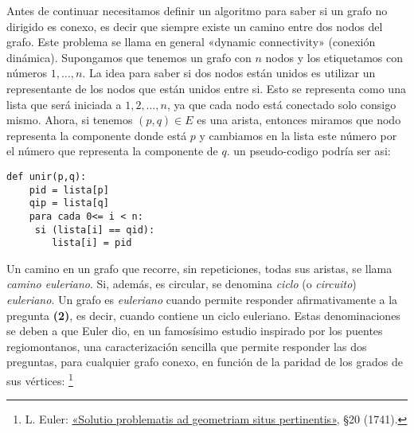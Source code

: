 Antes de continuar necesitamos definir un algoritmo para saber si un grafo no dirigido es conexo, es decir que siempre existe un camino entre dos nodos del grafo. Este problema se llama en general «dynamic connectivity» (conexión dinámica). Supongamos que tenemos un grafo con $n$ nodos y los etiquetamos con números ${1, \ldots, n}$.
La idea para saber si dos nodos están unidos es utilizar un representante de los nodos que están unidos entre si.
Esto se representa como una lista que será iniciada a ${1,2,\ldots, n}$, ya que cada nodo está conectado solo consigo mismo. Ahora, si tenemos $(p,q)\in E$ es una arista, entonces miramos que nodo representa la componente donde está $p$ y cambiamos en la lista este número por el número que representa la componente de $q$.
un pseudo-codigo podría ser asi:
\begin{verbatim}
def unir(p,q):
    pid = lista[p]
    qip = lista[q]
    para cada 0<= i < n:
     si (lista[i] == qid):
        lista[i] = pid
\end{verbatim}




Un camino en un grafo que recorre, sin repeticiones, todas
sus aristas, se llama \emph{camino euleriano}. Si, además,
es circular, se denomina \emph{ciclo}
(o \emph{circuito}) \emph{euleriano}. Un grafo es
\emph{euleriano} cuando permite responder afirmativamente a la
pregunta {\color{naranja_muy}\small\bf(2)}, es decir, cuando
contiene un ciclo euleriano. Estas denominaciones se deben a
que Euler dio, en un famosísimo estudio inspirado por los
puentes regiomontanos, una caracterización sencilla que
permite responder las dos preguntas, para cualquier grafo
conexo, en función de la paridad de los grados de sus
vértices:%
\footnote{{\sc L. Euler}:
\href{http://eulerarchive.maa.org/pages/E053.html}
{«Solutio problematis ad geometriam situs pertinentis»},
§20 (1741).}


